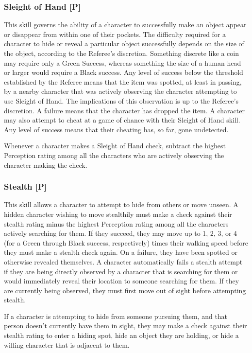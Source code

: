 \documentclass[oneside]{book}
\begin{document}
\begin{multicols}{2}
\subsubsection{Sleight of Hand [P]}
This skill governs the ability of a character to successfully make an object appear or disappear from within one of their pockets. The difficulty required for a character to hide or reveal a particular object successfully depends on the size of the object, according to the Referee's discretion. Something discrete like a coin may require only a Green Success, whereas something the size of a human head or larger would require a Black success. Any level of success below the threshold established by the Referee means that the item was spotted, at least in passing, by a nearby character that was actively observing the character attempting to use Sleight of Hand. The implications of this observation is up to the Referee's discretion. A failure means that the character has dropped the item. A character may also attempt to cheat at a game of chance with their Sleight of Hand skill. Any level of success means that their cheating has, so far, gone undetected. 

Whenever a character makes a Sleight of Hand check, subtract the highest Perception rating among all the characters who are actively observing the character making the check. 

\subsubsection{Stealth [P]}
This skill allows a character to attempt to hide from others or move unseen. A hidden character wishing to move stealthily must make a check against their stealth rating minus the highest Perception rating among all the characters actively searching for them. If they succeed, they may move up to 1, 2, 3, or 4 (for a Green through Black success, respectively) times their walking speed before they must make a stealth check again. On a failure, they have been spotted or otherwise revealed themselves. A character automatically fails a stealth attempt if they are being directly observed by a character that is searching for them or would immediately reveal their location to someone searching for them. If they are currently being observed, they must first move out of sight before attempting stealth. 

If a character is attempting to hide from someone pursuing them, and that person doesn't currently have them in sight, they may make a check against their stealth rating to enter a hiding spot, hide an object they are holding, or hide a willing character that is adjacent to them.


\end{multicols}
\end{document}
